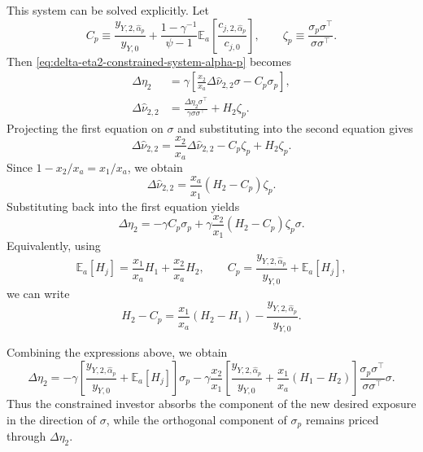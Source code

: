 This system can be solved explicitly.
Let
\begin{equation}
    C_p
    \equiv
    \frac{y_{Y,2,\hat{\alpha}_p}}{y_{Y,0}}
    +\frac{1-\gamma^{-1}}{\psi-1}\mathbb{E}_a\left[\frac{c_{j,2,\hat{\alpha}_p}}{c_{j,0}}\right],
    \qquad
    \zeta_p\equiv\frac{\sigma_p\sigma^\top}{\sigma\sigma^\top}.
\end{equation}
Then \eqref{eq:delta-eta2-constrained-system-alpha-p} becomes
\begin{align}
    \Delta\eta_2
    &=\gamma\left[\frac{x_2}{x_a}\Delta\hat{\nu}_{2,2}\sigma-C_p\sigma_p\right],\\
    \Delta\hat{\nu}_{2,2}
    &=\frac{\Delta\eta_2\sigma^\top}{\gamma\sigma\sigma^\top}+H_2\zeta_p.
\end{align}
Projecting the first equation on $\sigma$ and substituting into the second equation gives
\begin{equation}
    \Delta\hat{\nu}_{2,2}
    =\frac{x_2}{x_a}\Delta\hat{\nu}_{2,2}-C_p\zeta_p+H_2\zeta_p.
\end{equation}
Since $1-x_2/x_a=x_1/x_a$, we obtain
\begin{equation}\label{eq:delta-nu22-alpha-p-solution}
    \Delta\hat{\nu}_{2,2}
    =\frac{x_a}{x_1}(H_2-C_p)\zeta_p.
\end{equation}
Substituting back into the first equation yields
\begin{equation}\label{eq:delta-eta2-constrained-alpha-p-solution}
    \Delta\eta_2
    =-\gamma C_p\sigma_p
    +\gamma\frac{x_2}{x_1}(H_2-C_p)\zeta_p\sigma.
\end{equation}
Equivalently, using
\begin{equation}
    \mathbb{E}_a[H_j]=\frac{x_1}{x_a}H_1+\frac{x_2}{x_a}H_2,
    \qquad
    C_p=\frac{y_{Y,2,\hat{\alpha}_p}}{y_{Y,0}}+\mathbb{E}_a[H_j],
\end{equation}
we can write
\begin{equation}
    H_2-C_p
    =\frac{x_1}{x_a}(H_2-H_1)-\frac{y_{Y,2,\hat{\alpha}_p}}{y_{Y,0}}.
\end{equation}

Combining the expressions above, we obtain
\begin{equation}
    \Delta\eta_2
    =-\gamma \left[ \frac{y_{Y,2,\hat{\alpha}_p}}{y_{Y,0}}+\mathbb{E}_a[H_j] \right]\sigma_p
    -\gamma\frac{x_2}{x_1}\left[\frac{y_{Y,2,\hat{\alpha}_p}}{y_{Y,0}}+\frac{x_1}{x_a}\left(H_1-H_2\right)\right]\frac{\sigma_p\sigma^\top}{\sigma\sigma^\top}\sigma.
\end{equation}
Thus the constrained investor absorbs the component of the new desired exposure in the direction of $\sigma$, while the orthogonal component of $\sigma_p$ remains priced through $\Delta\eta_2$.

